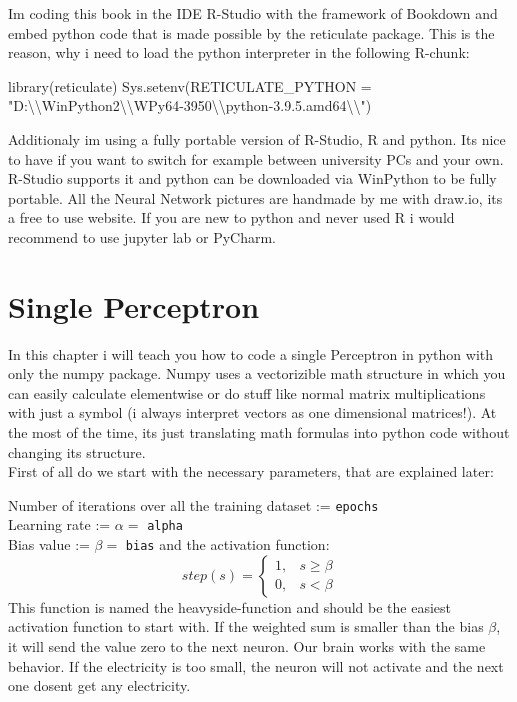 \documentclass[
]{book}
\newenvironment{Shaded}{\begin{snugshade}}{\end{snugshade}}
\newcommand{\AttributeTok}[1]{\textcolor[rgb]{0.77,0.63,0.00}{#1}}
\newcommand{\FunctionTok}[1]{\textcolor[rgb]{0.00,0.00,0.00}{#1}}
\newcommand{\NormalTok}[1]{#1}
\newcommand{\SpecialCharTok}[1]{\textcolor[rgb]{0.00,0.00,0.00}{#1}}
\newcommand{\StringTok}[1]{\textcolor[rgb]{0.31,0.60,0.02}{#1}}
\begin{document}
Im coding this book in the IDE R-Studio with the framework of Bookdown and embed python code that is made possible by the reticulate package. This is the reason, why i need to load the python interpreter in the following R-chunk:

\begin{Shaded}
\begin{Highlighting}[]
\FunctionTok{library}\NormalTok{(reticulate)}
\FunctionTok{Sys.setenv}\NormalTok{(}\AttributeTok{RETICULATE\_PYTHON =} \StringTok{"D:}\SpecialCharTok{\textbackslash{}\textbackslash{}}\StringTok{WinPython2}\SpecialCharTok{\textbackslash{}\textbackslash{}}\StringTok{WPy64{-}3950}\SpecialCharTok{\textbackslash{}\textbackslash{}}\StringTok{python{-}3.9.5.amd64}\SpecialCharTok{\textbackslash{}\textbackslash{}}\StringTok{"}\NormalTok{)}
\end{Highlighting}
\end{Shaded}

Additionaly im using a fully portable version of R-Studio, R and python. Its nice to have if you want to switch for example between university PCs and your own. R-Studio supports it and python can be downloaded via WinPython to be fully portable. All the Neural Network pictures are handmade by me with draw.io, its a free to use website. If you are new to python and never used R i would recommend to use jupyter lab or PyCharm.

\hypertarget{single-perceptron}{%
\chapter{Single Perceptron}\label{single-perceptron}}

In this chapter i will teach you how to code a single Perceptron in python with only the numpy package. Numpy uses a vectorizible math structure in which you can easily calculate elementwise or do stuff like normal matrix multiplications with just a symbol (i always interpret vectors as one dimensional matrices!). At the most of the time, its just translating math formulas into python code without changing its structure.\\
First of all do we start with the necessary parameters, that are explained later:

Number of iterations over all the training dataset := \texttt{epochs}\\
Learning rate := \(\alpha =\) \texttt{alpha}\\
Bias value := \(\beta =\) \texttt{bias}
and the activation function:\\
\[ 
step(s)= 
\begin{cases}
    1,& s   \geq \beta\\
    0,& s < \beta
\end{cases}
\]
This function is named the heavyside-function and should be the easiest activation function to start with. If the weighted sum is smaller than the bias \(\beta\), it will send the value zero to the next neuron. Our brain works with the same behavior. If the electricity is too small, the neuron will not activate and the next one dosent get any electricity.
\end{document}
